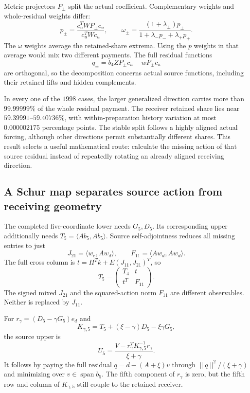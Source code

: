 Metric projectors $P_\pm$ split the actual coefficient. Complementary weights and whole-residual weights differ:
\[
 p_\pm=\frac{c_u^TWP_\pm c_u}{c_u^TWc_u},\qquad
 \omega_\pm=\frac{(1+\lambda_\pm)p_\pm}
                   {1+\lambda_-p_-+\lambda_+p_+}.
\]
The $\omega$ weights average the retained-share extrema. Using the $p$ weights in that average would mix two different payments. The full residual functions
\[
 q_\pm=b_4ZP_\pm c_u-wP_\pm c_u
\]
are orthogonal, so the decomposition concerns actual source functions, including their retained lifts and hidden complements.

In every one of the $1998$ cases, the larger generalized direction carries more than $99.99999\%$ of the whole residual payment. The receiver retained share lies near $59.39991$--$59.40736\%$, with within-preparation history variation at most $0.000002175$ percentage points. The stable split follows a highly aligned actual forcing, although other directions permit substantially different shares. This result selects a useful mathematical route: calculate the missing action of that source residual instead of repeatedly rotating an already aligned receiving direction.

\subsection{A Schur map separates source action from receiving geometry}

The completed five-coordinate lower needs $G_5,D_5$. Its corresponding upper additionally needs $T_5=\langle Ab_5,Ab_5\rangle$. Source self-adjointness reduces all missing entries to just
\[
 J_{21}=\langle w_e,Aw_d\rangle,\qquad
 F_{11}=\langle Aw_d,Aw_d\rangle.
\]
The full cross column is $t=H^Tk+E(J_{11},J_{21})^T$, so
\[
 T_5=\begin{pmatrix}T_4&t\\t^T&F_{11}\end{pmatrix}.
\]
The signed mixed $J_{21}$ and the squared-action norm $F_{11}$ are different observables. Neither is replaced by $J_{11}$. 

For $r_\gamma=(D_5-\gamma G_5)e_d$ and
\[
 K_{\gamma,5}=T_5+(\xi-\gamma)D_5-\xi\gamma G_5,
\]
the source upper is
\[
 U_5=\frac{V-r_\gamma^TK_{\gamma,5}^{-1}r_\gamma}{\xi+\gamma}.
\]
It follows by paying the full residual $q=d-(A+\xi)v$ through $\|q\|^2/(\xi+\gamma)$ and minimizing over $v\in\operatorname{span}b_5$. The fifth component of $r_\gamma$ is zero, but the fifth row and column of $K_{\gamma,5}$ still couple to the retained receiver.

